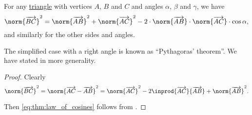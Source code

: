 \begin{theorem}\label{thm:law_of_cosines}
  For any \hyperref[def:triangle]{triangle} with vertices \( A \), \( B \) and \( C \) and angles \( \alpha \), \( \beta \) and \( \gamma \), we have
  \begin{equation}\label{eq:thm:law_of_cosines}
    \norm{\vect{BC}}^2 = \norm{\vect{AB}}^2 + \norm{\vect{AC}}^2 - 2 \cdot \norm{\vect{AB}} \cdot \norm{\vect{AC}} \cdot \cos \alpha,
  \end{equation}
  and similarly for the other sides and angles.

  The simplified case with a right angle is known as \enquote{Pythagoras' theorem}. We have stated  in more generality.
\end{theorem}
\begin{proof}
  Clearly
  \begin{equation*}
    \norm{\vect{BC}}^2
    =
    \norm{\vect{AC} - \vect{AB}}^2
    =
    \norm{\vect{AC}}^2 - 2 \inprod{\vect{AC}}{\vect{AB}} + \norm{\vect{AB}}^2.
  \end{equation*}

  Then \eqref{eq:thm:law_of_cosines} follows from .
\end{proof}

